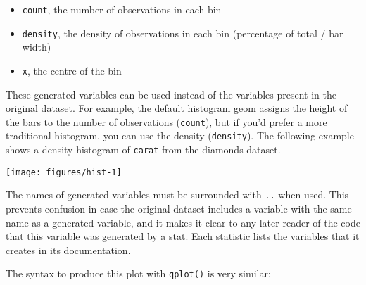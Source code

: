 \begin{itemize}
\itemsep1pt\parskip0pt
\item
  \texttt{count}, the number of observations in each bin
\item
  \texttt{density}, the density of observations in each bin (percentage
  of total / bar width)
\item
  \texttt{x}, the centre of the bin
\end{itemize}

These generated variables can be used instead of the variables present
in the original dataset. For example, the default histogram geom assigns
the height of the bars to the number of observations (\texttt{count}),
but if you'd prefer a more traditional histogram, you can use the
density (\texttt{density}). The following example shows a density
histogram of \texttt{carat} from the diamonds dataset.

\begin{Shaded}
\begin{Highlighting}[]
\NormalTok{>}\StringTok{ }\StringTok{ }
\NormalTok{+}\StringTok{   }\NormalTok{(}\NormalTok{(}  \NormalTok{)}
\end{Highlighting}
\end{Shaded}

\texttt{[image: figures/hist-1]}

The names of generated variables must be surrounded with \texttt{..}
when used. This prevents confusion in case the original dataset includes
a variable with the same name as a generated variable, and it makes it
clear to any later reader of the code that this variable was generated
by a stat. Each statistic lists the variables that it creates in its
documentation. 

The syntax to produce this plot with \texttt{qplot()} is very similar:

\begin{Shaded}
\begin{Highlighting}[]
 \NormalTok{, }
   \NormalTok{)}
\end{Highlighting}
\end{Shaded}

